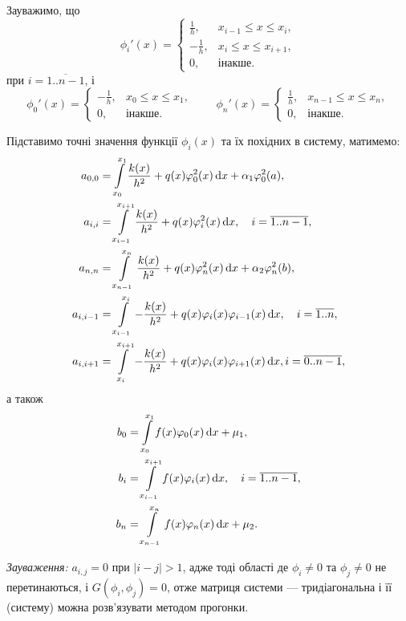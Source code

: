 Зауважимо, що
\begin{equation}
    \phi_i'(x) = \begin{cases}
        \frac{1}{h}, & x_{i - 1} \le x \le x_i, \\
        -\frac{1}{h}, & x_i \le x \le x_{i + 1}, \\
        0, & \text{інакше}.
    \end{cases}
\end{equation}
при $i = \overline{1..n-1}$, і
\begin{equation}
    \phi_0'(x) = \begin{cases}
        -\frac{1}{h}, & x_0 \le x \le x_{1}, \\
        0, & \text{інакше}.
    \end{cases}
    \qquad
    \phi_n'(x) = \begin{cases}
        \frac{1}{h}, & x_{n - 1} \le x \le x_n, \\
        0, & \text{інакше}.
    \end{cases}
\end{equation}

Підставимо точні значення функції $\phi_i(x)$ та їх похідних в систему, матимемо:
\begin{align}
    a_{0, 0} &= \displaystyle\int\limits_{x_0}^{x_1} \frac{k(x)}{h^2} + q(x) \varphi^2_0(x) \mathop{}\!\mathrm{d} x + \alpha_1 \varphi^2_0(a), \\
    a_{i, i} &= \displaystyle\int\limits_{x_{i - 1}}^{x_{i + 1}} \frac{k(x)}{h^2} + q(x) \varphi^2_i(x) \mathop{}\!\mathrm{d} x, \quad i = \overline{1..n-1}, \\
    a_{n, n} &= \displaystyle\int\limits_{x_{n - 1}}^{x_n} \frac{k(x)}{h^2} + q(x) \varphi^2_n(x) \mathop{}\!\mathrm{d} x + \alpha_2 \varphi^2_n(b), \\
    a_{i, i - 1} &= \displaystyle\int\limits_{x_{i - 1}}^{x_i} -\frac{k(x)}{h^2} + q(x) \varphi_i(x) \varphi_{i - 1}(x) \mathop{}\!\mathrm{d} x, \quad i = \overline{1..n}, \\
    a_{i, i + 1} &= \displaystyle\int\limits_{x_i}^{x_{i + 1}} -\frac{k(x)}{h^2} + q(x) \varphi_i(x) \varphi_{i + 1}(x) \mathop{}\!\mathrm{d} x, i = \overline{0..n-1},
\end{align}
а також
\begin{align}
    b_0 &= \displaystyle\int\limits_{x_0}^{x_1} f(x) \varphi_0(x) \mathop{}\!\mathrm{d} x + \mu_1, \\
    b_i &= \displaystyle\int\limits_{x_{i - 1}}^{x_{i + 1}} f(x) \varphi_i(x) \mathop{}\!\mathrm{d} x, \quad i = \overline{1..n-1}, \\
    b_n &= \displaystyle\int\limits_{x_{n - 1}}^{x_n} f(x) \varphi_n(x) \mathop{}\!\mathrm{d} x + \mu_2.
\end{align}

\textit{Зауваження:} $a_{i,j} = 0$ при $|i - j| > 1$, адже тоді області де $\phi_i \ne 0$ та $\phi_j \ne 0$ не перетинаються, і $G(\phi_i, \phi_j) = 0$, отже матриця системи --- тридіагональна і її (систему) можна розв'язувати методом прогонки.

